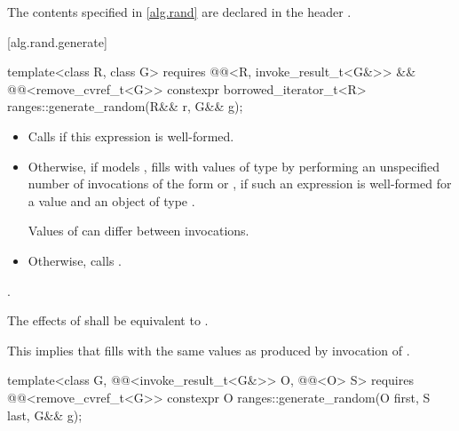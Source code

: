 \pnum
The contents specified in \ref{alg.rand}
are declared in the header .

[alg.rand.generate]{}

\begin{itemdecl}
template<class R, class G>
  requires @@<R, invoke_result_t<G&>> && @@<remove_cvref_t<G>>
constexpr borrowed_iterator_t<R> ranges::generate_random(R&& r, G&& g);
\end{itemdecl}

\begin{itemdescr}
\pnum
\effects
\begin{itemize}
\item
Calls 
if this expression is well-formed.
\item
Otherwise, if  models ,
fills  with  values of
type  by performing
an unspecified number of invocations of
the form  or ,
if such an expression is well-formed for a value  and
an object  of type .
\begin{note}
Values of  can differ between invocations.
\end{note}
\item
Otherwise, calls .
\end{itemize}

\pnum
\returns
{}.

\pnum
\remarks
The effects of  shall be equivalent to
.
\begin{note}
This implies that  fills 
with the same values as produced by invocation of .
\end{note}
\end{itemdescr}

\begin{itemdecl}
template<class G, @@<invoke_result_t<G&>> O, @@<O> S>
  requires @@<remove_cvref_t<G>>
constexpr O ranges::generate_random(O first, S last, G&& g);
\end{itemdecl}

